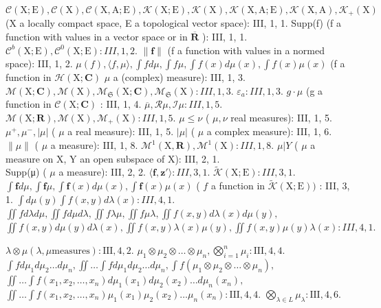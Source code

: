 \(\mathcal{C}(\mathrm{X};\mathrm{E}),\mathcal{C}(\mathrm{X}),\mathcal{C}(\mathrm{X},\mathrm{A};\mathrm{E}),\mathcal{K}(\mathrm{X};\mathrm{E}),\mathcal{K}(\mathrm{X}),\mathcal{K}(\mathrm{X},\mathrm{A};\mathrm{E}),\mathcal{K}(\mathrm{X},\mathrm{A}),\mathcal{K}_{+}(\mathrm{X})\) (X a locally compact space, E a topological vector space): III, 1, 1. Supp(f) (f a function with values in a vector space or in \(\overline{\mathbf{R}}\) ): III, 1, 1. \(\mathcal{C}^b (\mathrm{X};\mathrm{E}),\mathcal{C}^0 (\mathrm{X};\mathrm{E}):III,1,2.\) \(\| \mathbf{f}\|\) (f a function with values in a normed space): III, 1, 2. \(\mu (f),\langle f,\mu \rangle ,\int fd\mu ,\int f\mu ,\int f(x)d\mu (x),\int f(x)\mu (x)\) (f a function in \(\mathcal{H}(\mathrm{X};\mathbf{C})\) \(\mu\) a (complex) measure): III, 1, 3. \(\mathcal{M}(\mathrm{X};\mathbf{C}),\mathcal{M}(\mathrm{X}),\mathcal{M}_{\mathfrak{S}}(\mathrm{X};\mathbf{C}),\mathcal{M}_{\mathfrak{S}}(\mathrm{X}):III,1,3.\) \(\varepsilon_{a}:III,1,3.\) \(g\cdot \mu\) (g a function in \(\mathcal{C}(\mathrm{X};\mathbf{C})\) : III, 1, 4. \(\overline{\mu},\mathcal{R}\mu ,\mathcal{I}\mu :III,1,5.\) \(\mathcal{M}(\mathrm{X};\mathbf{R}),\mathcal{M}(\mathrm{X}),\mathcal{M}_{+}(\mathrm{X}):III,1,5.\) \(\mu \leqslant \nu\) ( \(\mu ,\nu\) real measures): III, 1, 5. \(\mu^{+},\mu^{-},|\mu |\) ( \(\mu\) a real measure): III, 1, 5. \(|\mu |\) ( \(\mu\) a complex measure): III, 1, 6. \(\| \mu \|\) ( \(\mu\) a measure): III, 1, 8. \(\mathcal{M}^1 (\mathrm{X},\mathbf{R}),\mathcal{M}^1 (\mathrm{X}):III,1,8.\) \(\mu |Y\) ( \(\mu\) a measure on X, Y an open subspace of X): III, 2, 1.\\
Supp(μ) ( \(\mu\) a measure): III, 2, 2. \(\langle \mathbf{f},\mathbf{z}'\rangle :III,3,1.\) \(\widetilde{\mathcal{K}} (\mathrm{X};\mathrm{E}):III,3,1.\) \(\int \mathbf{f}d\mu ,\int \mathbf{f}\mu ,\int \mathbf{f}(x)d\mu (x),\int \mathbf{f}(x)\mu (x)\) ( \(f\) a function in \(\widetilde{\mathcal{K}} (\mathrm{X};\mathrm{E}))\) : III, 3, 1. \(\int d\mu (y)\int f(x,y)d\lambda (x):III,4,1.\) \(\iint f d\lambda d\mu ,\iint f d\mu d\lambda ,\iint f\lambda \mu ,\iint f\mu \lambda ,\iint f(x,y)d\lambda (x)d\mu (y),\) \(\iint f(x,y)d\mu (y)d\lambda (x),\iint f(x,y)\lambda (x)\mu (y),\iint f(x,y)\mu (y)\lambda (x):III,4,1.\)

\(\lambda \otimes \mu (\lambda ,\mu \text{measures}):\mathrm{III},4,2.\) \(\mu_1\otimes \mu_2\otimes \dots \otimes \mu_n,\bigotimes_{i = 1}^n\mu_i:\mathrm{III},4,4.\) \(\int f d\mu_1d\mu_2\dots d\mu_n,\iint \dots \int f d\mu_1d\mu_2\dots d\mu_n,\int f(\mu_1\otimes \mu_2\otimes \dots \otimes \mu_n),\) \(\iint \dots \int f(x_1,x_2,\ldots ,x_n)d\mu_1(x_1)d\mu_2(x_2)\dots d\mu_n(x_n),\) \(\iint \dots \int f(x_1,x_2,\ldots ,x_n)\mu_1(x_1)\mu_2(x_2)\dots \mu_n(x_n):\mathrm{III},4,4.\) \(\bigotimes_{\lambda \in L}\mu_{\lambda}:\mathrm{III},4,6.\)

